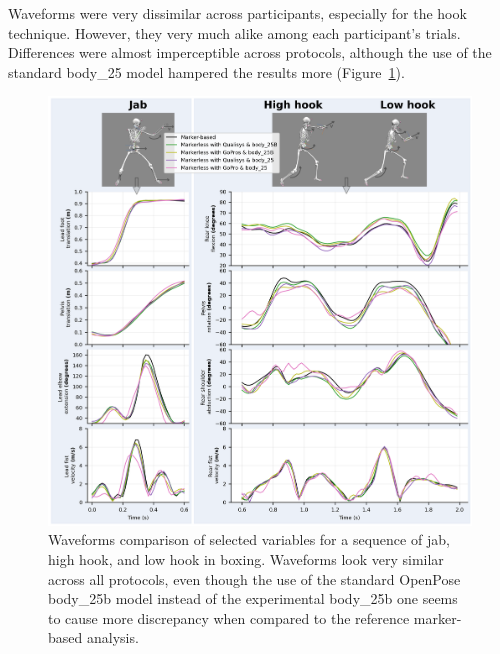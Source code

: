 Waveforms were very dissimilar across participants, especially for the hook technique. However, they very much alike among each participant's trials. Differences were almost imperceptible across protocols, although the use of the standard body\_25 model hampered the results more (Figure~\ref{fig_graphkpi}).

\begin{figure}[!ht]
	\centering
	\def\svgwidth{1\columnwidth}
	\fontsize{10pt}{10pt}\selectfont
	\includegraphics[width=\linewidth]{"../Chap6/Figures/Fig_GraphKPI.png"}
	\caption{Waveforms comparison of selected variables for a sequence of jab, high hook, and low hook in boxing. Waveforms look very similar across all protocols, even though the use of the standard OpenPose body\_25b model instead of the experimental body\_25b one seems to cause more discrepancy when compared to the reference marker-based analysis.}
	\label{fig_graphkpi}
\end{figure}

